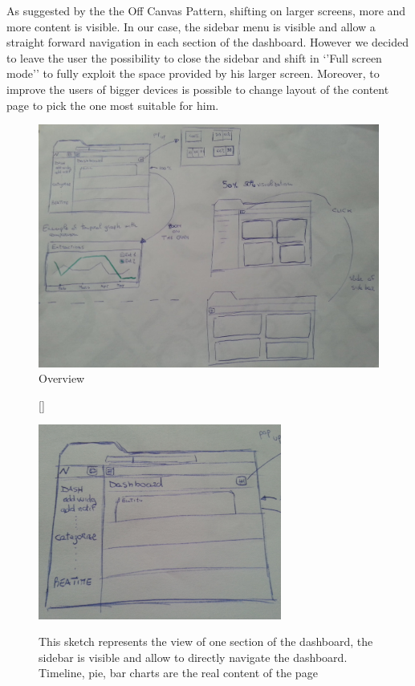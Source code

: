 \documentclass[a4paper,13pt]{report}
\begin{document}
As suggested by the  the Off Canvas Pattern, shifting on larger screens, more and more content is visible. In our case, the sidebar menu is visible and allow a straight forward navigation in each section of the dashboard. However we decided to leave the user the possibility to close the sidebar and shift in `'Full screen mode'' to fully exploit the space provided by his larger screen. Moreover, to improve the users of bigger devices is possible to change layout of the content page to pick the one most suitable for him.
\begin{figure}[H]
  \caption{Overview}
  \centering
    \includegraphics[width=1\textwidth]{pics/UISketches/desk0}
\end{figure}

\begin{figure}[H]
[\FBwidth]
{\caption{This sketch represents the view of one section of the dashboard, the sidebar is visible and allow to directly navigate the dashboard. Timeline, pie, bar charts are the real content of the page}\label{fig:test}}
{\includegraphics[width=8cm]{pics/UISketches/desk1}}
\end{figure}
\end{document}
